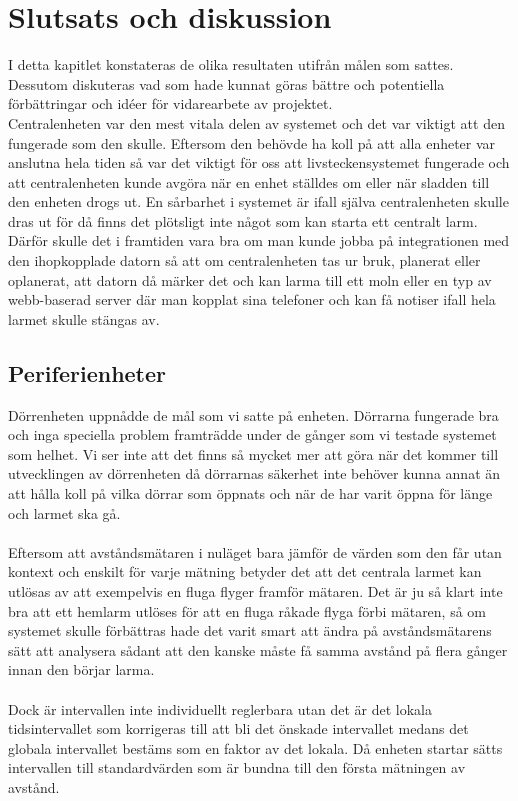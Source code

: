 \documentclass{article}
\begin{document}
\section{Slutsats och diskussion}
I detta kapitlet konstateras de olika resultaten utifrån målen som sattes.
Dessutom diskuteras vad som hade kunnat göras bättre och potentiella förbättringar och idéer för vidarearbete av projektet.\\


Centralenheten var den mest vitala delen av systemet och det var viktigt att den fungerade som den skulle.
Eftersom den behövde ha koll på att alla enheter var anslutna hela tiden så var det viktigt för oss att livsteckensystemet fungerade och att centralenheten kunde avgöra när en enhet ställdes om eller när sladden till den enheten drogs ut.
En sårbarhet i systemet är ifall själva centralenheten skulle dras ut för då finns det plötsligt inte något som kan starta ett centralt larm. 
Därför skulle det i framtiden vara bra om man kunde jobba på integrationen med den ihopkopplade datorn så att om centralenheten tas ur bruk, planerat eller oplanerat, att datorn då märker det och kan larma till ett moln eller en typ av webb-baserad server där man kopplat sina telefoner och kan få notiser ifall hela larmet skulle stängas av.


\subsection{Periferienheter}
\noindent
Dörrenheten uppnådde de mål som vi satte på enheten. 
Dörrarna fungerade bra och inga speciella problem framträdde under de gånger som vi testade systemet som helhet. 
Vi ser inte att det finns så mycket mer att göra när det kommer till utvecklingen av dörrenheten då dörrarnas säkerhet inte behöver kunna annat än att hålla koll på vilka dörrar som öppnats och när de har varit öppna för länge och larmet ska gå.\\
\\
\noindent
Eftersom att avståndsmätaren i nuläget bara jämför de värden som den får utan kontext och enskilt för varje mätning betyder det att det centrala larmet kan utlösas av att exempelvis en fluga flyger framför mätaren.
Det är ju så klart inte bra att ett hemlarm utlöses för att en fluga råkade flyga förbi mätaren, så om systemet skulle förbättras hade det varit smart att ändra på avståndsmätarens sätt att analysera sådant att den kanske måste få samma avstånd på flera gånger innan den börjar larma.\\
\\
\noindent
Dock är intervallen inte individuellt reglerbara utan det är det lokala tidsintervallet som korrigeras till att bli det önskade intervallet medans det globala intervallet bestäms som en faktor av det lokala. 
Då enheten startar sätts intervallen till standardvärden som är bundna till den första mätningen av avstånd. 
\end{document}
